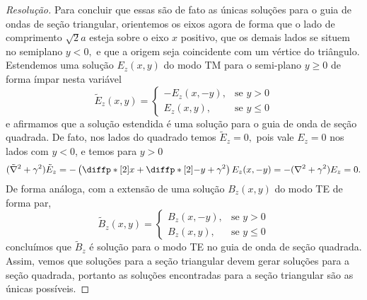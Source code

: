 \begin{proof}[Resolução]
    Para concluir que essas são de fato as únicas soluções para o guia de ondas de seção triangular, orientemos os eixos agora de forma que o lado de comprimento \(\sqrt{2}a\) esteja sobre o eixo \(x\) positivo, que os demais lados se situem no semiplano \(y < 0,\) e que a origem seja coincidente com um vértice do triângulo. Estendemos uma solução \(E_z(x,y)\) do modo TM para o semi-plano \(y \geq 0\) de forma ímpar nesta variável
    \begin{equation*}
        \tilde{E}_z(x,y) = \begin{cases}
            - E_z(x, -y),&\text{se }y>0\\
            E_z(x, y),&\text{se }y\leq0
        \end{cases}
    \end{equation*}
    e afirmamos que a solução estendida é uma solução para o guia de onda de seção quadrada. De fato, nos lados do quadrado temos \(\tilde{E}_z = 0,\) pois vale \(E_z = 0\) nos lados com \(y < 0\), e temos para \(y > 0\)
    \begin{equation*}
        (\tilde{\nabla}^2 + \gamma^2)\tilde{E}_z = -\left(\diffp*[2]{}{x} + \diffp*[2]{}{-y} + \gamma^2\right)E_z(x,-y) = - (\nabla^2 + \gamma^2) E_z = 0.
    \end{equation*}
    De forma análoga, com a extensão de uma solução \(B_z(x,y)\) do modo TE de forma par,
    \begin{equation*}
        \tilde{B}_z(x,y) = \begin{cases}
            B_z(x, -y),&\text{se }y>0\\
            B_z(x, y),&\text{se }y\leq0
        \end{cases}
    \end{equation*}
    concluímos que \(\tilde{B}_z\) é solução para o modo TE no guia de onda de seção quadrada. Assim, vemos que soluções para a seção triangular devem gerar soluções para a seção quadrada, portanto as soluções encontradas para a seção triangular são as únicas possíveis.
\end{proof}
